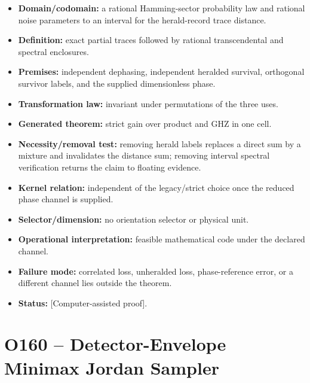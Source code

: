 \documentclass[11pt,a4paper,openany]{report}
\begin{document}
\begin{itemize}
\item 
\textbf{Domain/\allowbreak{}codomain:} a rational Hamming-sector probability law and rational noise parameters to an interval for the herald-record trace distance.

\item 
\textbf{Definition:} exact partial traces followed by rational transcendental and spectral enclosures.

\item 
\textbf{Premises:} independent dephasing, independent heralded survival, orthogonal survivor labels, and the supplied dimensionless phase.

\item 
\textbf{Transformation law:} invariant under permutations of the three uses.

\item 
\textbf{Generated theorem:} strict gain over product and GHZ in one cell.

\item 
\textbf{Necessity/\allowbreak{}removal test:} removing herald labels replaces a direct sum by a mixture and invalidates the distance sum; removing interval spectral verification returns the claim to floating evidence.

\item 
\textbf{Kernel relation:} independent of the legacy/\allowbreak{}strict choice once the reduced phase channel is supplied.

\item 
\textbf{Selector/\allowbreak{}dimension:} no orientation selector or physical unit.

\item 
\textbf{Operational interpretation:} feasible mathematical code under the declared channel.

\item 
\textbf{Failure mode:} correlated loss, unheralded loss, phase-reference error, or a different channel lies outside the theorem.

\item 
\textbf{Status:} \textcolor{fingreen}{[Computer-assisted proof]}.

\end{itemize}

\section{O160 -- Detector-Envelope Minimax Jordan Sampler}
\end{document}
